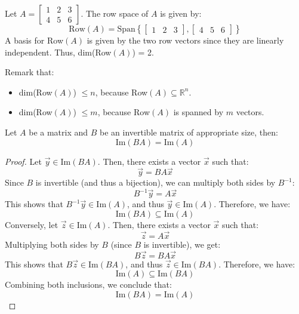 \begin{eg}
    Let $A = \begin{bmatrix}
        1 & 2 & 3 \\
        4 & 5 & 6
    \end{bmatrix}$. The row space of $A$ is given by:
    \[ \text{Row}(A) = \text{Span}\left\{ \begin{bmatrix}
        1 & 2 & 3
    \end{bmatrix}, \begin{bmatrix}
        4 & 5 & 6
    \end{bmatrix} \right\} \]
    A basis for Row$(A)$ is given by the two row vectors since they are linearly independent. Thus, dim(Row$(A)$) = 2.
\end{eg}
Remark that:
\begin{itemize}[itemsep=1pt,label=$\circ$]
    \item dim(Row$(A)$) $\leq n$, because Row$(A) \subseteq \mathbb{R}^n$.
    \item dim(Row$(A)$) $\leq m$, because Row$(A)$ is spanned by $m$ vectors.
\end{itemize}
Let $A$ be a matrix and $B$ be an invertible matrix of appropriate size, then:
\[ \text{Im}(B A) = \text{Im}(A) \]
\begin{proof}
    Let $\vec{y} \in \text{Im}(B A)$. Then, there exists a vector $\vec{x}$ such that:
    \[ \vec{y} = B A \vec{x} \]
    Since $B$ is invertible (and thus a bijection), we can multiply both sides by $B^{-1}$:
    \[ B^{-1} \vec{y} = A \vec{x} \]
    This shows that $B^{-1} \vec{y} \in \text{Im}(A)$, and thus $\vec{y} \in \text{Im}(A)$. Therefore, we have:
    \[ \text{Im}(B A) \subseteq \text{Im}(A) \]
    Conversely, let $\vec{z} \in \text{Im}(A)$. Then, there exists a vector $\vec{x}$ such that:
    \[ \vec{z} = A \vec{x} \]
    Multiplying both sides by $B$ (since $B$ is invertible), we get:
    \[ B \vec{z} = B A \vec{x} \]
    This shows that $B \vec{z} \in \text{Im}(B A)$, and thus $\vec{z} \in \text{Im}(B A)$. Therefore, we have:
    \[ \text{Im}(A) \subseteq \text{Im}(B A) \]
    Combining both inclusions, we conclude that:
    \[ \text{Im}(B A) = \text{Im}(A) \]
\end{proof}

